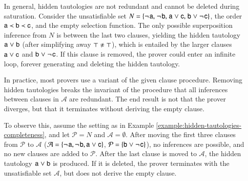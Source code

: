 \begin{exa}
   \label{example:hidden-tautologies-completeness}
   In general, hidden tautologies are not redundant and cannot be deleted during saturation.
   Consider the unsatisfiable set $N = \{ \neg{\kern.2ex \mathsf{a}}{,}\;
   \neg{\kern.2ex \mathsf{b}}{,}\; {\mathsf{a}} \mathrel{\lor}
   {\mathsf{c}}{,}\allowbreak\; {\mathsf{b}} \mathrel{\lor} \neg{\kern.2ex \mathsf{c}}
   \}$, the order $\mathsf{a} \prec
   \mathsf{b} \prec \mathsf{c}$, and the empty selection function. The
   only possible superposition inference from $N$ is between the last two clauses,
   yielding the hidden tautology ${\mathsf{a}} \mathrel{\lor} {\mathsf{b}}$
   (after simplifying away $\neqlit{\top}{\top}$), which is entailed by the larger
   clauses ${\mathsf{a}} \mathrel{\lor} {\mathsf{c}}$ and
   ${\mathsf{b}} \mathrel{\lor} \neg{\kern.2ex \mathsf{c}}$. If this clause is removed,
   the prover could enter an infinite loop, forever generating and deleting the
   hidden tautology.
\end{exa}

\begin{rep}
   \newcommand{\aset}{\mathcal{A}}
   \newcommand{\pset}{\mathcal{P}}
   
   In practice, most provers use a variant of the given clause procedure.
   Removing hidden tautologies breaks the invariant of the procedure that all
   inferences between clauses in $\aset$ are redundant. The end result is not
   that the prover diverges, but that it terminates without deriving the empty
   clause.

   To observe this, assume the setting as in Example
   \ref{example:hidden-tautologies-completeness}, and let $\pset=N$ and
   $\aset=\emptyset$. After moving the first three clauses from $\pset$ to
   $\aset$ ($\aset = \{ \negpredlit{\cst{a}}, \negpredlit{\cst{b}}, \pospredlit{\cst{a}} \cor
   \pospredlit{\cst{c}} \}$, $\pset = \{\pospredlit{\cst{b}} \cor \negpredlit{\cst{c}}\}$), 
   no inferences are possible, and no new clauses are added to $\pset$. After the last clause
   is moved to $\aset$, the hidden tautology ${\mathsf{a}} \mathrel{\lor} {\mathsf{b}}$
   is produced. If it is deleted, the prover terminates with the unsatisfiable set $\aset$,
   but does not derive the empty clause. 
\end{rep}

